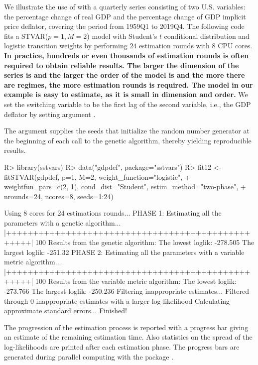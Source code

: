 \documentclass[nojss]{jss}
\begin{document}
We illustrate the use of  with a quarterly series consisting of two U.S. variables: the percentage change of real GDP and the percentage change of GDP implicit price deflator, covering the period from 1959Q1 to 2019Q4. The following code fits a STVAR($p=1,M=2$) model with Student's $t$ conditional distribution and logistic transition weights by performing $24$ estimation rounds with $8$ CPU cores. \textbf{In practice, hundreds or even thousands of estimation rounds is often required to obtain reliable results. The larger the dimension of the series is and the larger the order of the model is and the more there are regimes, the more estimation rounds is required. The model in our example is easy to estimate, as it is small in dimension and order.} We set the switching variable to be the first lag of the second variable, i.e., the GDP deflator by setting argument .

The argument  supplies the seeds that initialize the random number generator at the beginning of each call to the genetic algorithm, thereby yielding reproducible results.
%
\begin{CodeChunk}
\begin{CodeInput}
R> library(sstvars)
R> data("gdpdef", package="sstvars")
R> fit12 <- fitSTVAR(gdpdef, p=1, M=2, weight_function="logistic",
+    weightfun_pars=c(2, 1), cond_dist="Student", estim_method="two-phase",
+    nrounds=24, ncores=8, seeds=1:24)
\end{CodeInput}
\begin{CodeOutput}
Using 8 cores for 24 estimations rounds...
PHASE 1: Estimating all the parameters with a genetic algorithm...
  |++++++++++++++++++++++++++++++++++++++++++++++++++| 100%
Results from the genetic algorithm:
The lowest loglik:  -278.505
The largest loglik: -251.32
PHASE 2: Estimating all the parameters with a variable metric algorithm...
  |++++++++++++++++++++++++++++++++++++++++++++++++++| 100%
Results from the variable metric algorithm:
The lowest loglik:  -273.766
The largest loglik: -250.236
Filtering inappropriate estimates...
Filtered through 0 inappropriate  estimates with a larger log-likelihood
Calculating approximate standard errors...
Finished!
\end{CodeOutput}
\end{CodeChunk}
%
The progression of the estimation process is reported with a progress bar giving an estimate of the remaining estimation time. Also statistics on the spread of the log-likelihoods are printed after each estimation phase. The progress bars are generated during parallel computing with the package  \citep{Solymos+Zawadzki:2020}.
\end{document}
